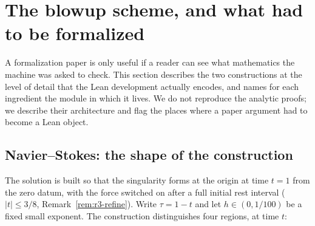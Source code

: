 \section{The blowup scheme, and what had to be formalized}
\label{sec:scheme}

A formalization paper is only useful if a reader can see what mathematics the machine was
asked to check. This section describes the two constructions at the level of detail that
the Lean development actually encodes, and names for each ingredient the module in which
it lives. We do not reproduce the analytic proofs; we describe their architecture and
flag the places where a paper argument had to become a Lean object.

\subsection{Navier--Stokes: the shape of the construction}
\label{sec:ns-shape}

The solution is built so that the singularity forms at the origin at time $t=1$ from the
zero datum, with the force switched on after a full initial rest interval
($|t|\le 3/8$, Remark~\ref{rem:r3-refine}). Write $\tau=1-t$ and let $h\in(0,1/100)$ be a
fixed small exponent. The construction distinguishes four regions, at time $t$:

\begin{center}
\end{center}

